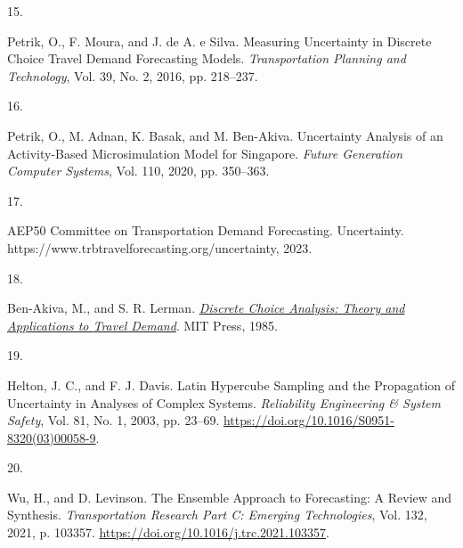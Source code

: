 \documentclass[
  letterpaper,
]{trb}
\newlength{\cslhangindent}
\newlength{\csllabelwidth}
\newlength{\cslentryspacingunit} %
\newenvironment{CSLReferences}[2] %
 {%
  \setlength{\parindent}{0pt}
  \ifodd #1
  \let\oldpar\par
  \def\par{\hangindent=\cslhangindent\oldpar}
  \fi
  \setlength{\parskip}{#2\cslentryspacingunit}
 }%
 {}
\newcommand{\CSLLeftMargin}[1]{\parbox[t]{\csllabelwidth}{#1}}
\newcommand{\CSLRightInline}[1]{\parbox[t]{\linewidth - \csllabelwidth}{#1}\break}
\begin{document}
\begin{CSLReferences}{0}{0}
\leavevmode{}%
\CSLLeftMargin{15. }%
\CSLRightInline{Petrik, O., F. Moura, and J. de A. e Silva. Measuring
Uncertainty in Discrete Choice Travel Demand Forecasting Models.
\emph{Transportation Planning and Technology}, Vol. 39, No. 2, 2016, pp.
218--237.}

\leavevmode{}%
\CSLLeftMargin{16. }%
\CSLRightInline{Petrik, O., M. Adnan, K. Basak, and M. Ben-Akiva.
Uncertainty Analysis of an Activity-Based Microsimulation Model for
{Singapore}. \emph{Future Generation Computer Systems}, Vol. 110, 2020,
pp. 350--363.}

\leavevmode{}%
\CSLLeftMargin{17. }%
\CSLRightInline{AEP50 Committee on Transportation Demand Forecasting.
Uncertainty. https://www.trbtravelforecasting.org/uncertainty, 2023.}

\leavevmode{}%
\CSLLeftMargin{18. }%
\CSLRightInline{Ben-Akiva, M., and S. R. Lerman.
\emph{\href{https://www.jstor.org/stable/1391567}{Discrete {Choice
Analysis}: {Theory} and {Applications} to {Travel Demand}}}. {MIT
Press}, 1985.}

\leavevmode{}%
\CSLLeftMargin{19. }%
\CSLRightInline{Helton, J. C., and F. J. Davis. Latin Hypercube Sampling
and the Propagation of Uncertainty in Analyses of Complex Systems.
\emph{Reliability Engineering \& System Safety}, Vol. 81, No. 1, 2003,
pp. 23--69. \url{https://doi.org/10.1016/S0951-8320(03)00058-9}.}

\leavevmode{}%
\CSLLeftMargin{20. }%
\CSLRightInline{Wu, H., and D. Levinson. The Ensemble Approach to
Forecasting: {A} Review and Synthesis. \emph{Transportation Research
Part C: Emerging Technologies}, Vol. 132, 2021, p. 103357.
\url{https://doi.org/10.1016/j.trc.2021.103357}.}

\end{CSLReferences}
\end{document}
